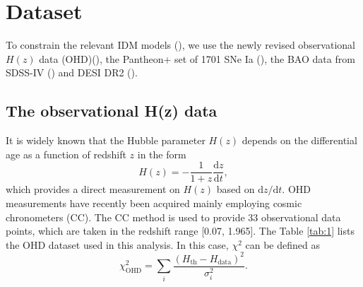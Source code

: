 \documentclass[twocolumn]{aastex631}
\begin{document}
\section{Dataset}

   To constrain the relevant IDM models (\cite{Basilakos_2009}), we use the newly revised
   observational $H(z)$ data (OHD)(\cite{PhysRevD.71.123001, Daniel.Stern_2010, 
   M.Moresco_2012, Zhang_2014, Moresco_2016, 10.1093/mnras/stx301, 10.1093/mnrasl/slv037, 
   Borghi_2022, Jiao_2023}), the Pantheon+ set of 1701 SNe Ia 
   (\cite{Scolnic_2022}), the BAO data from SDSS-IV (\cite{PhysRevD.103.083533}) and DESI DR2 
   (\cite{desicollaboration2025desidr2resultsii}).

\subsection{The observational H(z) data}

   It is widely known that the Hubble parameter $H(z)$ depends on
   the differential age as a function of redshift $z$ in the form
   \begin{equation}
      H(z)=-\frac{1}{1+z}\frac{\mathrm{d}z}{\mathrm{d}t},\label{eq:12}
   \end{equation}
   which provides a direct measurement on $H(z)$ based on
   $\mathrm{d}z/\mathrm{d}t$.
   OHD measurements have recently been acquired mainly employing
   cosmic chronometers (CC). The CC method is used to provide 33 observational
   data points, which are taken in the redshift range [0.07, 1.965].
   The Table \ref{tab:1} lists the OHD dataset used in this analysis.
   In this case, $\chi^2$ can be defined as
   \begin{equation}
      \chi_{\text{OHD}}^2=\sum_i\frac{(H_{\text{th}}-H_{\text{data}})^2}{\sigma_i^2}.
   \end{equation}
\end{document}
